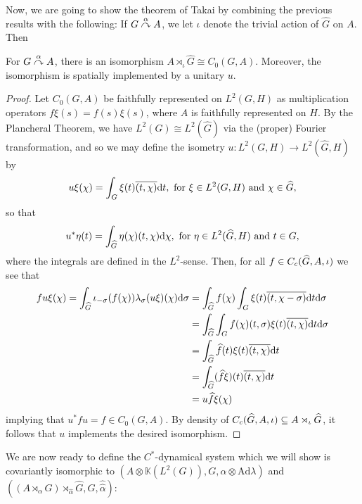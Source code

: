 Now, we are going to show the theorem of Takai by combining the previous results with the following: If $G \stackrel{\alpha}{\curvearrowright} A$, we let $\iota$ denote the trivial action of $\hat G$ on $A$. Then
\begin{lemma}
For $G \stackrel{\alpha}{\curvearrowright} A$, there is an isomorphism $A \rtimes_\iota \hat G \cong C_0(G,A)$. Moreover, the isomorphism is spatially implemented by a unitary $u$.
\label{takai:trivcrossiso}
\end{lemma}
\begin{proof}
Let $C_0(G,A)$ be faithfully represented on $L^2(G,H)$ as multiplication operators $f \xi(s) = f(s) \xi(s)$, where $A$ is faithfully represented on $H$. By the Plancheral Theorem, we have $L^2(G) \cong L^2(\hat G)$ via the (proper) Fourier transformation, and so we may define the isometry $u \colon L^2(G,H) \to L^2(\hat G,H)$ by
\begin{align*}
	u \xi(\chi) = \int_G \xi(t) \overline{(t, \chi)} \mathrm{d} t, \text{ for } \xi \in L^2(G,H) \text{ and } \chi \in \widehat{G},
\end{align*}
so that 
\begin{align*}
	u^* \eta (t) = \int_{\widehat{G}} \eta(\chi) (t, \chi) \mathrm{d} \chi, \text{ for } \eta \in L^2(\widehat{G},H) \text{ and } t \in G,
\end{align*}
where the integrals are defined in the $L^2$-sense. Then, for all $f \in C_c(\widehat{G}, A,\iota)$ we see that
\begin{align*}
	f u \xi(\chi) = \int_{\widehat{G}} \iota_{-\sigma}(f(\chi)) \lambda_\sigma (u \xi)(\chi) \mathrm{d} \sigma &= \int_{\widehat{G}} f(\chi) \int_G \xi(t) \overline{(t,\chi - \sigma)} \mathrm{d} t \mathrm{d} \sigma\\
	&= \int_{\widehat{G}}\int_G f(\chi)(t, \sigma) \xi(t) \overline{(t, \chi)} \mathrm{d} t \mathrm{d} \sigma\\
	&= \int_{\widehat{G}} \widehat{f}(t) \xi(t) \overline{(t, \chi)} \mathrm{d} t\\
	&= \int_{\widehat{G}} (\widehat{f} \xi)(t) \overline{(t, \chi)} \mathrm{d} t\\
	&= u \widehat{f} \xi(\chi)
\end{align*}
implying that $u^* f u = \hat f \in C_0(G, A)$. By density of $C_c(\widehat{G}, A, \iota) \subseteq A \rtimes_\iota \widehat{G}$, it follows that $u$ implements the desired isomorphism.
\end{proof}
We are now ready to define the $C^*$-dynamical system which we will show is covariantly isomorphic to $(A \otimes \mathbb{K}(L^2(G)), G, \alpha \otimes \mathrm{Ad} \lambda)$ and $\left( (A \rtimes_\alpha G)\rtimes_{\hat \alpha} \hat G, G, \hat{\hat \alpha} \right)$:
